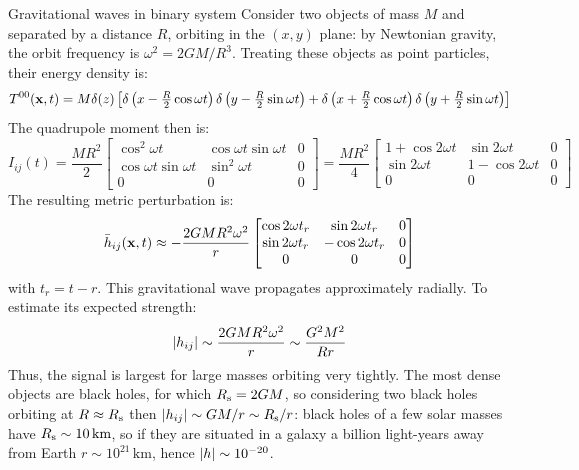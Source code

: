 \begin{example}{Gravitational waves in binary system}{}
  Consider two objects of mass $ M $ and separated by a distance $ R $, orbiting in the $ (x,y) $ plane: by Newtonian gravity, the orbit frequency is $ \omega^2 = 2GM / R^3 $. Treating these objects as point particles, their energy density is:
  \begin{equation*}
    T^{00}(\mathbf{x},t) = M \delta(z) \left[ \delta \left( x - \tfrac{R}{2} \cos \omega t \right) \delta \left( y - \tfrac{R}{2} \sin \omega t \right) + \delta \left( x + \tfrac{R}{2} \cos \omega t \right) \delta \left( y + \tfrac{R}{2} \sin \omega t \right) \right]
  \end{equation*}
  The quadrupole moment then is:
  \begin{equation*}
    I_{ij} (t) = \frac{MR^2}{2}
    \begin{bmatrix}
      \cos^2 \omega t & \cos \omega t \sin \omega t & 0 \\
      \cos \omega t \sin \omega t & \sin^2 \omega t & 0 \\
      0 & 0 & 0
    \end{bmatrix}
    = \frac{MR^2}{4}
    \begin{bmatrix}
      1 + \cos 2 \omega t & \sin 2 \omega t & 0 \\
      \sin 2 \omega t & 1 - \cos 2 \omega t & 0 \\
      0 & 0 & 0
    \end{bmatrix}
  \end{equation*}
  The resulting metric perturbation is:
  \begin{equation*}
    \bar{h}_{ij}(\mathbf{x},t) \approx - \frac{2GMR^2 \omega^2}{r}
    \begin{bmatrix}
      \cos 2 \omega t_r & \sin 2 \omega t_r & 0 \\
      \sin 2 \omega t_r & - \cos 2 \omega t_r & 0 \\
      0 & 0 & 0
    \end{bmatrix}
  \end{equation*}
  with $ t_r = t - r $. This gravitational wave propagates approximately radially. To estimate its expected strength:
  \begin{equation*}
    \left\lvert h_{ij}\right\rvert \sim \frac{2GMR^2 \omega^2}{r} \sim \frac{G^2 M^2}{Rr}
  \end{equation*}
  Thus, the signal is largest for large masses orbiting very tightly. The most dense objects are black holes, for which $ R_\text{s} = 2GM $, so considering two black holes orbiting at $ R \approx R_\text{s} $ then $ \left\lvert h_{ij}\right\rvert \sim GM / r \sim R_\text{s} / r $: black holes of a few solar masses have $ R_\text{s} \sim 10\,\text{km} $, so if they are situated in a galaxy a billion light-years away from Earth $ r \sim 10^{21}\,\text{km} $, hence $ \left\lvert h\right\rvert \sim 10^{-20} $.
\end{example}

